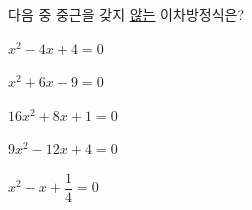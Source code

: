 다음 중 중근을 갖지 \underline{않는} 이차방정식은?
\begin{choicesii}{\rule[-3ex]{0pt}{8ex}$x^2-4x+4=0$}{\rule[-3ex]{0pt}{8ex}$x^2+6x-9=0$}{\rule[-3ex]{0pt}{8ex}$16x^2+8x+1=0$}{\rule[-3ex]{0pt}{8ex}$9x^2-12x+4=0$}{\rule[-3ex]{0pt}{8ex}$x^2-x+\dfrac{1}{4}=0$}\end{choicesii}
